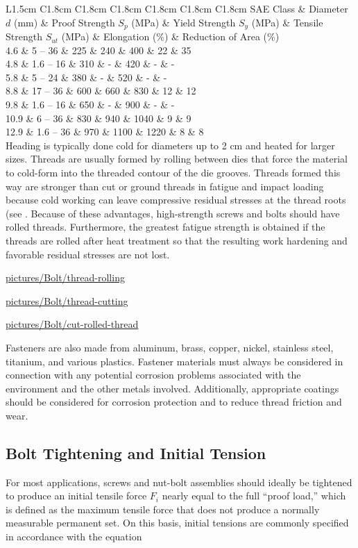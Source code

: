 \documentclass[a4paper,openany,nobib]{tufte-book}
\begin{document}
{{ L1.5cm C1.8cm C1.8cm C1.8cm C1.8cm C1.8cm C1.8cm SAE Class \& Diameter
\(d\) (mm) \& Proof Strength \(S_p\) (MPa) \& Yield Strength \(S_y\) (MPa) \&
Tensile Strength \(S_{ut}\) (MPa) \& Elongation (\%) \& Reduction of Area
(\%)\\
4.6 \& 5 -- 36 \& 225 \& 240 \& 400 \& 22 \& 35\\
4.8 \& 1.6 -- 16 \& 310 \& - \& 420 \& - \& -\\
5.8 \& 5 -- 24 \& 380 \& - \& 520 \& - \& -\\
8.8 \& 17 -- 36 \& 600 \& 660 \& 830 \& 12 \& 12\\
9.8 \& 1.6 -- 16 \& 650 \& - \& 900 \& - \& -\\
10.9 \& 6 -- 36 \& 830 \& 940 \& 1040 \& 9 \& 9\\
12.9 \& 1.6 -- 36 \& 970 \& 1100 \& 1220 \& 8 \& 8\\

Heading is typically done cold for diameters up to 2 cm and heated for
larger sizes. Threads are usually formed by rolling between dies that
force the material to cold-form into the threaded contour of the die
grooves. Threads formed this way are stronger than cut or ground threads
in fatigue and impact loading because cold working can leave compressive
residual stresses at the thread roots (see . Because of these
advantages, high-strength screws and bolts should have rolled threads.
Furthermore, the greatest fatigue strength is obtained if the threads
are rolled after heat treatment so that the resulting work hardening and
favorable residual stresses are not lost.


\url{pictures/Bolt/thread-rolling}


\url{pictures/Bolt/thread-cutting}


\url{pictures/Bolt/cut-rolled-thread}

Fasteners are also made from aluminum, brass, copper, nickel, stainless
steel, titanium, and various plastics. Fastener materials must always be
considered in connection with any potential corrosion problems
associated with the environment and the other metals involved.
Additionally, appropriate coatings should be considered for corrosion
protection and to reduce thread friction and wear.

\subsection{Bolt Tightening and Initial Tension}
\label{bolt-tightening-and-initial-tension}
For most applications, screws and nut-bolt assemblies should ideally be
tightened to produce an initial tensile force \(F_i\) nearly equal to the
full ``proof load,'' which is defined as the maximum tensile force that
does not produce a normally measurable permanent set. On this basis,
initial tensions are commonly specified in accordance with the equation

}}
\end{document}
